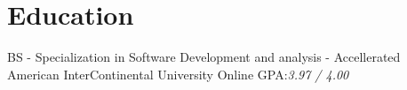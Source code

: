 \documentclass{resume-class/nadario_resume}
\begin{document}
\makecvtitle{}

\section{Education}
        {BS - Specialization in Software Development and analysis - Accellerated}
        {American InterContinental University}
        {Online}
        {GPA:\textit{3.97 / 4.00}}{}
\end{document}
